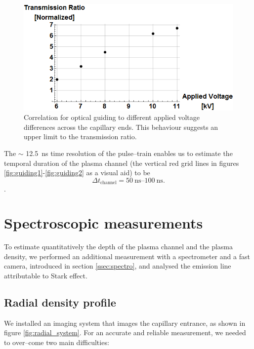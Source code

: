 \documentclass[../main.tex]{subfiles}
\begin{document}
\begin{figure}
    \centering
    \includegraphics[width=\textwidth]{figures/oscillator/voltage vs guiding.png}
    \caption{Correlation for optical guiding to different applied voltage differences across the capillary ends. This behaviour suggests an upper limit to the transmission ratio.}
    \label{fig:voltagevsguiding}
\end{figure}

The $\sim$ \SI{12.5}{\ns} time resolution of the pulse--train enables us to estimate the temporal duration of the plasma channel (the vertical red grid lines in figures \ref{fig:guiding1}-\ref{fig:guiding2} as a visual aid) to be $$\Delta t_\text{channel}=\SIrange{50}{100}{\ns}.$$.

\section{Spectroscopic measurements}\label{sec:spectro}
To estimate quantitatively the depth of the plasma channel and the plasma density, we performed an additional measurement with a spectrometer and a fast camera, introduced in section \ref{ssec:spectro}, and analysed the emission line attributable to Stark effect.

\subsection{Radial density profile}\label{ssec:radial}
We installed an imaging system that images the capillary entrance, as shown in figure \ref{fig:radial_system}. For an accurate and reliable measurement, we needed to over--come two main difficulties:
\end{document}
